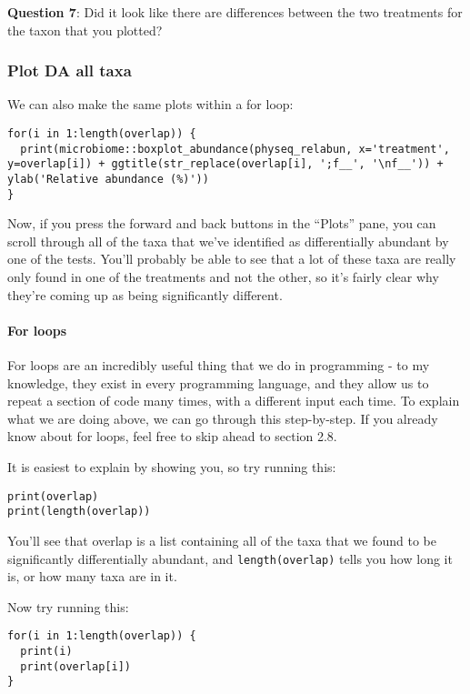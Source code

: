 \documentclass[
]{book}
\begin{document}
\textbf{Question 7}: Did it look like there are differences between the two treatments for the taxon that you plotted?

\subsubsection{Plot DA all taxa}\label{plot-da-all-taxa}

We can also make the same plots within a for loop:

\begin{verbatim}
for(i in 1:length(overlap)) {
  print(microbiome::boxplot_abundance(physeq_relabun, x='treatment', y=overlap[i]) + ggtitle(str_replace(overlap[i], ';f__', '\nf__')) + ylab('Relative abundance (%)'))
}
\end{verbatim}

Now, if you press the forward and back buttons in the ``Plots'' pane, you can scroll through all of the taxa that we've identified as differentially abundant by one of the tests. You'll probably be able to see that a lot of these taxa are really only found in one of the treatments and not the other, so it's fairly clear why they're coming up as being significantly different.

\paragraph{For loops}\label{for-loops}

For loops are an incredibly useful thing that we do in programming - to my knowledge, they exist in every programming language, and they allow us to repeat a section of code many times, with a different input each time. To explain what we are doing above, we can go through this step-by-step. If you already know about for loops, feel free to skip ahead to section 2.8.

It is easiest to explain by showing you, so try running this:

\begin{verbatim}
print(overlap)
print(length(overlap))
\end{verbatim}

You'll see that overlap is a list containing all of the taxa that we found to be significantly differentially abundant, and \texttt{length(overlap)} tells you how long it is, or how many taxa are in it.

Now try running this:

\begin{verbatim}
for(i in 1:length(overlap)) {
  print(i)
  print(overlap[i])
}
\end{verbatim}
\end{document}

